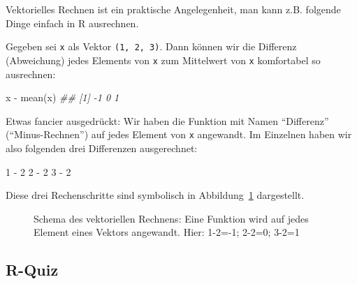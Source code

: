 \documentclass[
  a4paper,
  DIV=11]{scrreprt}
\newenvironment{Shaded}{\begin{snugshade}}{\end{snugshade}}
\newcommand{\DecValTok}[1]{\textcolor[rgb]{0.68,0.00,0.00}{#1}}
\newcommand{\DocumentationTok}[1]{\textcolor[rgb]{0.37,0.37,0.37}{\textit{#1}}}
\newcommand{\FunctionTok}[1]{\textcolor[rgb]{0.28,0.35,0.67}{#1}}
\newcommand{\NormalTok}[1]{\textcolor[rgb]{0.00,0.23,0.31}{#1}}
\newcommand{\SpecialCharTok}[1]{\textcolor[rgb]{0.37,0.37,0.37}{#1}}
\theoremstyle{definition}
\theoremstyle{definition}
\theoremstyle{definition}
\theoremstyle{remark}
\begin{document}
Vektorielles Rechnen ist ein praktische Angelegenheit, man kann z.B.
folgende Dinge einfach in R ausrechnen.

Gegeben sei \texttt{x} als Vektor \texttt{(1,\ 2,\ 3)}. Dann können wir
die Differenz (Abweichung) jedes Elements von \texttt{x} zum Mittelwert
von \texttt{x} komfortabel so ausrechnen:

\begin{Shaded}
\begin{Highlighting}[]
\NormalTok{x }\SpecialCharTok{{-}} \FunctionTok{mean}\NormalTok{(x)}
\DocumentationTok{\#\# [1] {-}1  0  1}
\end{Highlighting}
\end{Shaded}

Etwas fancier ausgedrückt: Wir haben die Funktion mit Namen
``Differenz'' (``Minus-Rechnen'') auf jedes Element von \texttt{x}
angewandt. Im Einzelnen haben wir also folgenden drei Differenzen
ausgerechnet:

\begin{Shaded}
\begin{Highlighting}[]
\DecValTok{1} \SpecialCharTok{{-}} \DecValTok{2}
\DecValTok{2} \SpecialCharTok{{-}} \DecValTok{2}
\DecValTok{3} \SpecialCharTok{{-}} \DecValTok{2}
\end{Highlighting}
\end{Shaded}

Diese drei Rechenschritte sind symbolisch in
Abbildung~\ref{fig-vektoriell} dargestellt.

\begin{figure}


\caption{\label{fig-vektoriell}Schema des vektoriellen Rechnens: Eine
Funktion wird auf jedes Element eines Vektors angewandt. Hier: 1-2=-1;
2-2=0; 3-2=1}

\end{figure}%

\subsection{R-Quiz}\label{r-quiz}
\end{document}
